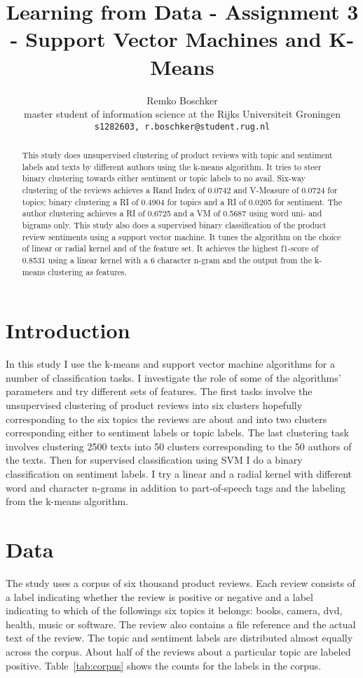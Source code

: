 \documentclass[11pt]{article}
\title{Learning from Data - Assignment 3 - Support Vector Machines and K-Means}
\author{Remko Boschker \\
  master student of information science at the Rijks Universiteit Groningen \\
  {\tt s1282603, r.boschker@student.rug.nl} }
\date{}
\begin{document}
\maketitle
\begin{abstract}

This study does unsupervised clustering of product reviews with topic and sentiment labels and texts by different authors using the k-means algorithm. It tries to steer binary clustering towards either sentiment or topic labels to no avail. Six-way clustering of the reviews achieves a Rand Index of 0.0742 and V-Measure of 0.0724 for topics; binary clustering a RI of 0.4904 for topics and a RI of 0.0205 for sentiment. The author clustering achieves a RI of 0.6725 and a VM of 0.5687 using word uni- and bigrams only. This study also does a supervised binary classification of the product review sentiments using a support vector machine. It tunes the algorithm on the choice of linear or radial kernel and of the feature set. It achieves the highest f1-score of 0.8531 using a linear kernel with a 6 character n-gram and the output from the k-means clustering as features.  

\end{abstract}

\section{Introduction}

In this study I use the k-means and support vector machine algorithms for a number of classification tasks. I investigate the role of some of the algorithms' parameters and try different sets of features. The first tasks involve the unsupervised clustering of product reviews into six clusters hopefully corresponding to the six topics the reviews are about and into two clusters corresponding either to sentiment labels or topic labels. The last clustering task involves clustering 2500 texts into 50 clusters corresponding to the 50 authors of the texts. Then for supervised classification using SVM I do a binary classification on sentiment labels. I try a linear and a radial kernel with different word and character n-grams in addition to part-of-speech tags and the labeling from the k-means algorithm.

\section{Data}

The study uses a corpus of six thousand product reviews. Each review consists of a label indicating whether the review is positive or negative and a label indicating to which of the followings six topics it belongs: books, camera, dvd, health, music or software. The review also contains a file reference and the actual text of the review. The topic and sentiment labels are distributed almost equally across the corpus. About half of the reviews about a particular topic are labeled positive. Table~\ref{tab:corpus} shows the counts for the labels in the corpus.
\end{document}
